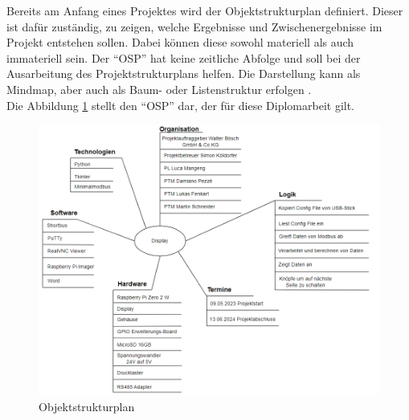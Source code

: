 Bereits am Anfang eines Projektes wird der Objektstrukturplan definiert. Dieser ist dafür zuständig, zu zeigen, welche Ergebnisse und Zwischenergebnisse im Projekt entstehen sollen. Dabei können diese sowohl materiell als auch immateriell sein. Der \enquote{OSP} hat keine zeitliche Abfolge und soll bei der Ausarbeitung des Projektstrukturplans helfen. Die Darstellung kann als Mindmap, aber auch als Baum- oder Listenstruktur erfolgen \cite[vgl.][]{fsgu-akademie:2022}. \\
Die Abbildung \ref{fig:objektstrukturplan} stellt den \enquote{OSP} dar, der für diese Diplomarbeit gilt.

\begin{figure}[H]
	\centering
	\includegraphics[width=1\linewidth]{Bilder/objektstrukturenplan}
	\caption{Objektstrukturplan}
	\label{fig:objektstrukturplan}
\end{figure}